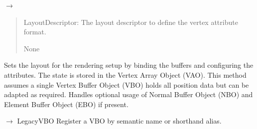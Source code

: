 \documentclass[a4paper,10pt,english,openany,oneside]{sphinxmanual}
\begin{document}
\begin{fulllineitems}
\begin{fulllineitems}
\label{\detokenize{api/buffers:picogl.backend.modern.core.vertex.array.object.VertexArrayObject.set_layout}}
\pysigstartsignatures
\pysiglinewithargsret
{}
{}
{{ $\rightarrow$ }}
\pysigstopsignatures\begin{quote}\begin{description}
\sphinxAtStartPar
{} \textendash{} LayoutDescriptor: The layout descriptor to define the vertex attribute format.

\sphinxAtStartPar
None

\end{description}\end{quote}

\sphinxAtStartPar
Sets the layout for the rendering setup by binding the buffers and configuring the attributes.
The state is stored in the Vertex Array Object (VAO). This method assumes a single Vertex Buffer
Object (VBO) holds all position data but can be adapted as required. Handles optional usage of
Normal Buffer Object (NBO) and Element Buffer Object (EBO) if present.

\end{fulllineitems}


\begin{fulllineitems}
\label{\detokenize{api/buffers:picogl.backend.modern.core.vertex.array.object.VertexArrayObject.add_vbo_object}}
\pysigstartsignatures
\pysiglinewithargsret
{}
{\sphinxparamcomma {}}
{{ $\rightarrow$ LegacyVBO}}
\pysigstopsignatures
\sphinxAtStartPar
Register a VBO by semantic name or shorthand alias.


\end{fulllineitems}
\end{fulllineitems}
\end{document}
